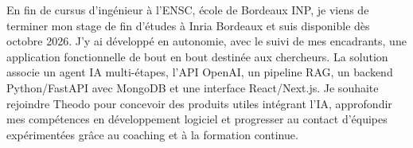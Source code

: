 
\begin{cvparagraph}
En fin de cursus d’ingénieur à l’ENSC, école de Bordeaux INP, je viens de terminer mon stage de fin d’études à Inria Bordeaux et suis disponible dès octobre 2026. J’y ai développé en autonomie, avec le suivi de mes encadrants, une application fonctionnelle de bout en bout destinée aux chercheurs. La solution associe un agent IA multi-étapes, l’API OpenAI, un pipeline RAG, un backend Python/FastAPI avec MongoDB et une interface React/Next.js. Je souhaite rejoindre Theodo pour concevoir des produits utiles intégrant l’IA, approfondir mes compétences en développement logiciel et progresser au contact d’équipes expérimentées grâce au coaching et à la formation continue.
\end{cvparagraph}
